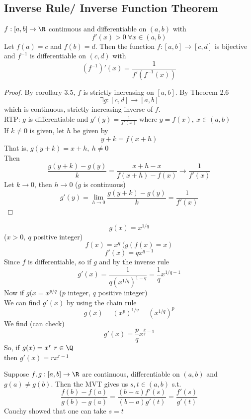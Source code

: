 \subsection{Inverse Rule/ Inverse Function Theorem}
\begin{theorem}
$f:[a,b]\to \R$ continuous and differentiable on $(a,b)$ with \[f'(x) > 0 \ \forall x\in (a,b)\]
Let $f(a) = c$ and $f(b) = d$. Then the function $f:[a,b] \to [c,d]$ is bijective and $f^{-1}$ is differentiable on $(c,d)$ with
\[(f^{-1})'(x) = \frac{1}{f'(f^{-1}(x))}\]
\begin{proof}
By corollary 3.5, $f$ is strictly increasing on $[a,b]$. By Theorem 2.6
\[\exists g: [c,d] \to [a,b]\]
which is continuous, strictly increasing inverse of $f$.\\
RTP: $g$ is differentiable and $g'(y) = \frac{1}{f'(x)}$ where $y = f(x), \ x \in (a,b)$\\
If $k\neq 0$ is given, let $h$ be given by
\[y+k = f(x+h)\]
That is, $g(y+k) = x+h, \ h\neq 0$\\
Then
\[\frac{g(y+k) - g(y)}{k} = \frac{ x+h -  x}{f(x+h) - f(x)}\to \frac{1}{f'(x)}\]
Let $k\to 0$, then $h\to 0$ ($g$ is continuous)
\[g'(y) = \lim_{h\to 0} \frac{g(y+k)-g(y)}{k} = \frac{1}{f'(x)}\]
\end{proof}
\end{theorem}
\begin{example}
\[g(x) = x^{1/q}\]
($x>0, \ q$ positive integer)
\[f(x) = x^q \ (g(f(x) = x)\]
\[f'(x) = qx^{q-1}\]
Since $f$ is differentiable, so if $g$ and by the inverse rule
\[g'(x) = \frac{1}{q(x^{1/q})^{1-q}} = \frac{1}{q}x^{1/q - 1}\]
Now if $g(x= x^{p/q}$ ($p$ integer, $q$ positive integer)\\
We can find $g'(x)$ by using the chain rule
\[g(x) = (x^p)^{1/q} = (x^{1/q})^p\]
We find (can check)
\[g'(x) = \frac{p}{q}x^{\frac{p}{q}-1}\]
So, if $g(x) = x^r \ r\in \Q$\\
then $g'(x) = rx^{r-1}$
\end{example}
\begin{remark}
Suppose $f,g:[a,b]\to \R$ are continuous, differentiable on $(a,b)$ and $g(a)\neq g(b)$. Then the MVT gives us $s,t\in (a,b)$ s.t.
\[\frac{f(b)-f(a)}{g(b)-g(a)} = \frac{(b-a)f'(s)}{(b-a)g'(t)} = \frac{f'(s)}{g'(t)}\]
Cauchy showed that one can take $s=t$
\end{remark}
